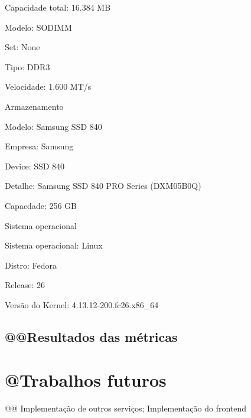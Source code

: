 \begin{alineas}
\begin{alineas}
     \item Capacidade total: 16.384 MB

     \item Modelo: SODIMM

     \item Set: None

     \item Tipo: DDR3

     \item Velocidade: 1.600 MT/s

  \end{alineas}

  \item Armazenamento

  \begin{alineas}

     \item Modelo: Samsung SSD 840

     \item Empresa: Samsung

     \item Device: SSD 840

     \item Detalhe: Samsung SSD 840 PRO Series (DXM05B0Q)

     \item Capacdade: 256 GB

  \end{alineas}

  \item Sistema operacional

  \begin{alineas}

     \item Sistema operacional: Linux

     \item Distro: Fedora

     \item Release: 26

     \item Versão do Kernel: 4.13.12-200.fc26.x86\_64

  \end{alineas}

\end{alineas}

\subsection{@@Resultados das métricas}



\section{@Trabalhos futuros}\label{trabalhos-futuros}

@@ Implementação de outros serviços; Implementação do frontend
